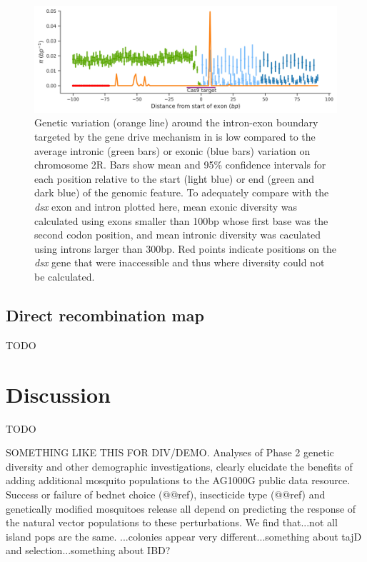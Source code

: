 \documentclass[a4paper,11pt,abstracton,hidelinks]{scrartcl}
\begin{document}

\begin{figure}[H]
	\begin{center}
		\includegraphics*[width=5.5in]{artwork/temp-cas9dsx/Cas9_target_diversity.jpg}
	\end{center}
	\caption{Genetic variation (orange line) around the intron-exon boundary targeted by the gene drive mechanism in \textcite{kyrou2018} is low compared to the average intronic (green bars) or exonic (blue bars) variation on chromosome 2R. Bars show mean and 95\% confidence intervals for each position relative to the start (light blue) or end (green and dark blue) of the genomic feature. To adequately compare with the \textit{dsx} exon and intron plotted here, mean exonic diversity was calculated using exons smaller than 100bp whose first base was the second codon position, and mean intronic diversity was caculated using introns larger than 300bp. Red points indicate positions on the \textit{dsx} gene that were inaccessible and thus where diversity could not be calculated.}
	\label{dsx1}
\end{figure}


\subsection*{Direct recombination map}
TODO

\section*{Discussion}


TODO


SOMETHING LIKE THIS FOR DIV/DEMO. Analyses of Phase 2 genetic diversity and other demographic investigations, clearly elucidate the benefits of adding additional mosquito populations to the AG1000G public data resource.
%
Success or failure of bednet choice (@@ref), insecticide type (@@ref) and genetically modified mosquitoes release all depend on predicting the response of the natural vector populations to these perturbations.
%
We find that...not all island pops are the same. ...colonies appear very different...something about tajD and selection...something about IBD?
\end{document}
